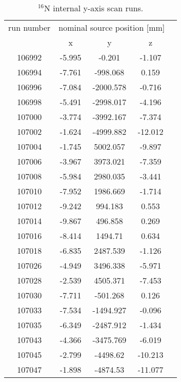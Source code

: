 \begin{table}[ht]
		\caption[]{$^{16}$N internal y-axis scan runs.}
		\label{table:n16scanTable_yscan}
				\centering
	\begin{tabular*}{90mm}{c@{\extracolsep{\fill}}*4c}
		\toprule 
		run number  & \multicolumn{3}{c}{nominal source position [mm]}  \\
		\cline{2-4}
		& x & y & z\\
		\midrule        
        106992 & -5.995 & -0.201 & -1.107\\
        106994 & -7.761 & -998.068 & 0.159\\
        106996 & -7.084 & -2000.578 & -0.716\\
        106998 & -5.491 & -2998.017 & -4.196\\
        107000 & -3.774 & -3992.167 & -7.374\\
        107002 & -1.624 & -4999.882 & -12.012\\
        107004 & -1.745 & 5002.057 & -9.897\\
        107006 & -3.967 & 3973.021 & -7.359\\
        107008 & -5.984 & 2980.035 & -3.441\\
        107010 & -7.952 & 1986.669 & -1.714\\
        107012 & -9.242 & 994.183 & 0.553\\
        107014 & -9.867 & 496.858 & 0.269\\
        107016 & -8.414 & 1494.71 & 0.634\\
        107018 & -6.835 & 2487.539 & -1.126\\
        107026 & -4.949 & 3496.338 & -5.971\\
        107028 & -2.539 & 4505.371 & -7.453\\
        107030 & -7.711 & -501.268 & 0.126\\
        107033 & -7.534 & -1494.927 & -0.096\\
        107035 & -6.349 & -2487.912 & -1.434\\
        107043 & -4.366 & -3475.769 & -6.019\\
        107045 & -2.799 & -4498.62 & -10.213\\
        107047 & -1.898 & -4874.53 & -11.077\\
        		\bottomrule	
       	\end{tabular*}
   \end{table} 

